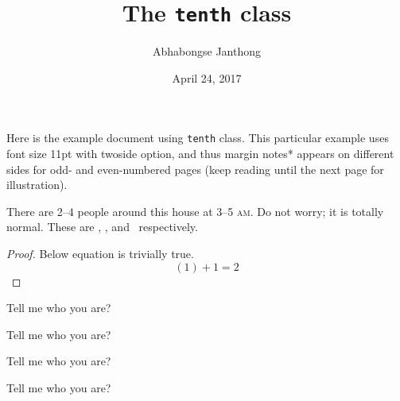 \documentclass[11pt,twoside]{tenth}
\title{The \texttt{tenth} class}
\author{Abhabongse Janthong}
\date{April 24, 2017}
\begin{document}
    \maketitle

    Here is the example document using \texttt{tenth} class. This particular example uses font size 11pt with twoside option, and thus margin notes*  appears on different sides for odd- and even-numbered pages (keep reading until the next page for illustration).

    \lipsum[1-5]

    There are 2--4 people around this house at 3--5 \textsc{am}.  Do not worry; it is totally normal. These are \redsq, \greensq, and \bluesq\ respectively.

    \begin{proof}
        Below equation is trivially true.
        \begin{equation}
            (1) + 1 = 2
        \end{equation}
    \end{proof}

    \begin{question}
        Tell me who you are?
    \end{question}
    \begin{definition}
        Tell me who you are?
    \end{definition}
    \begin{theorem}
        Tell me who you are?
    \end{theorem}
    \begin{remark}
        Tell me who you are?
    \end{remark}
\end{document}
